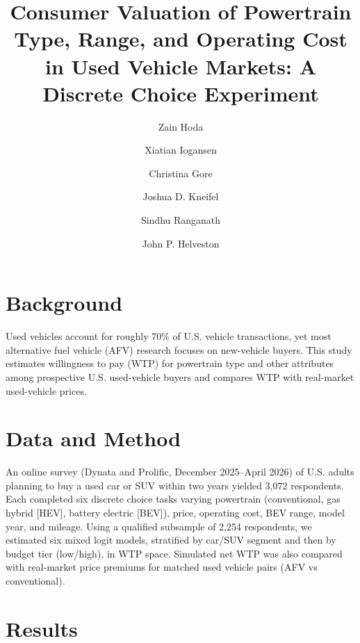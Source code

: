\documentclass[12pt,a4paper]{extarticle}
\date{}
\begin{document}
\title{\fontsize{14}{17}\selectfont\textbf{Consumer Valuation of Powertrain Type, Range, and Operating Cost in Used Vehicle Markets: A Discrete Choice Experiment}}

\author[1]{Zain Hoda}
\author[1,2]{Xiatian Iogansen}
\author[2]{Christina Gore}
\author[2]{Joshua D. Kneifel}
\author[1,2]{Sindhu Ranganath}
\author[1]{John P. Helveston}


\maketitle

\section*{Background}

Used vehicles account for roughly 70\% of U.S. vehicle transactions, yet most alternative fuel vehicle (AFV) research focuses on new-vehicle buyers. This study estimates willingness to pay (WTP) for powertrain type and other attributes among prospective U.S. used-vehicle buyers and compares WTP with real-market used-vehicle prices.

\section*{Data and Method}

An online survey (Dynata and Prolific, December 2025--April 2026) of U.S. adults planning to buy a used car or SUV within two years yielded 3,072 respondents. Each completed six discrete choice tasks varying powertrain (conventional, gas hybrid [HEV], battery electric [BEV]), price, operating cost, BEV range, model year, and mileage. Using a qualified subsample of 2,254 respondents, we estimated six mixed logit models, stratified by car/SUV segment and then by budget tier (low/high), in WTP space. Simulated net WTP was also compared with real-market price premiums for matched used vehicle pairs (AFV vs conventional).

\section*{Results}
\end{document}
